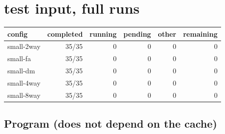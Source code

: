 \documentclass[10pt,a4paper,landscape]{article}
\begin{document}
\section*{test input, full runs}
{\small
\begin{longtable}{lrrrrr}
\toprule
config & completed & running & pending & other & remaining \\
\midrule
\endhead
\bottomrule
\endfoot
small-2way & 35/35 & 0 & 0 & 0 & 0 \\
small-fa & 35/35 & 0 & 0 & 0 & 0 \\
small-dm & 35/35 & 0 & 0 & 0 & 0 \\
small-4way & 35/35 & 0 & 0 & 0 & 0 \\
small-8way & 35/35 & 0 & 0 & 0 & 0 \\
\end{longtable}
}
\subsection*{Program (does not depend on the cache)}
\end{document}
